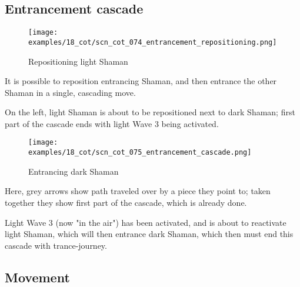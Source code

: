 \subsection*{Entrancement cascade}
\label{sec:Conquest of Tlalocan/Trance-journey/Entrancement cascade}

\noindent
\begin{wrapfigure}[9]{l}{0.4\textwidth}
\centering
\texttt{[image: examples/18\_cot/scn\_cot\_074\_entrancement\_repositioning.png]}
\vspace*{-0.4\baselineskip}
\caption{Repositioning light Shaman}
\label{fig:scn_cot_074_entrancement_repositioning}
\end{wrapfigure}
It is possible to reposition entrancing Shaman, and then entrance the other Shaman
in a single, cascading move.

On the left, light Shaman is about to be repositioned next to dark Shaman; first
part of the cascade ends with light Wave 3 being activated.

\vspace*{5.3\baselineskip}

\noindent
\begin{wrapfigure}[11]{l}{0.4\textwidth}
\centering
\texttt{[image: examples/18\_cot/scn\_cot\_075\_entrancement\_cascade.png]}
\vspace*{-0.4\baselineskip}
\caption{Entrancing dark Shaman}
\label{fig:scn_cot_075_entrancement_cascade}
\end{wrapfigure}
Here, grey arrows show path traveled over by a piece they point to; taken together
they show first part of the cascade, which is already done.

Light Wave 3 (now "in the air") has been activated, and is about to reactivate
light Shaman, which will then entrance dark Shaman, which then must end this
cascade with trance-journey.

\clearpage %

\subsection*{Movement}
\label{sec:Conquest of Tlalocan/Trance-journey/Movement}

